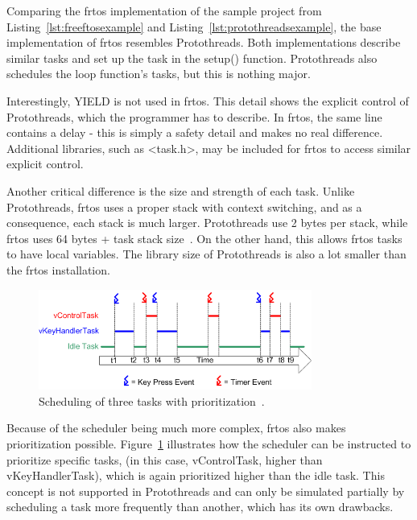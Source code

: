 Comparing the \gls{frtos} implementation of the sample project from Listing~\ref{lst:freeftosexample} and Listing~\ref{lst:protothreadsexample}, the base implementation of \gls{frtos} resembles Protothreads. Both implementations describe similar tasks and set up the task in the setup() function. Protothreads also schedules the loop function's tasks, but this is nothing major.

Interestingly, YIELD is not used in \gls{frtos}. This detail shows the explicit control of Protothreads, which the programmer has to describe. In \gls{frtos}, the same line contains a delay - this is simply a safety detail and makes no real difference. Additional libraries, such as <task.h>, may be included for \gls{frtos} to access similar explicit control.

Another critical difference is the size and strength of each task. Unlike Protothreads, \gls{frtos} uses a proper stack with context switching, and as a consequence, each stack is much larger. Protothreads use 2 bytes per stack, while \gls{frtos} uses 64 bytes + task stack size~\cite{AboutRTOS}. On the other hand, this allows \gls{frtos} tasks to have local variables. The library size of Protothreads is also a lot smaller than the \gls{frtos} installation.


\begin{figure}[htbp]
  \centering
  \includegraphics[width=0.8\textwidth]{figures/FreeRTOS_Prioritization.png}
  \caption{Scheduling of three tasks with prioritization~\cite{SchedulingRTOS}.}
  \label{fig:freertosprio}
\end{figure}


Because of the scheduler being much more complex, \gls{frtos} also makes prioritization possible. Figure~\ref{fig:freertosprio} illustrates how the scheduler can be instructed to prioritize specific tasks, (in this case, vControlTask, higher than vKeyHandlerTask), which is again prioritized higher than the idle task. This concept is not supported in Protothreads and can only be simulated partially by scheduling a task more frequently than another, which has its own drawbacks.


